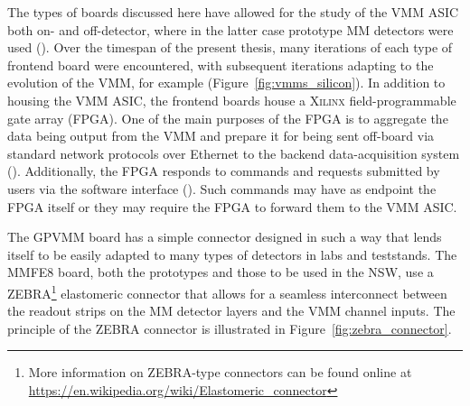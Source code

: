The types of boards discussed here have allowed for the study of the VMM ASIC both on- and off-detector,
where in the latter case prototype MM detectors were used ({\color{red}{More to say in Section XXX}}).
Over the timespan of the present thesis, many iterations of each type of frontend board
were encountered, with subsequent iterations adapting to the evolution of the VMM, for example (Figure~\ref{fig:vmms_silicon}).
In addition to housing the VMM ASIC, the frontend boards house a
\textsc{Xilinx} field-programmable gate array (FPGA). 
One of the main purposes of the FPGA is to aggregate the data being output from the VMM
and prepare it for being sent off-board via standard network protocols over Ethernet to the
backend data-acquisition system ({\color{red}{Section XXX}}).
Additionally, the FPGA responds to commands and requests submitted by users via the software
interface ({\color{red}{Section XXX}}).
Such commands may have as endpoint the FPGA itself or they may require the FPGA to forward
them to the VMM ASIC.

The GPVMM board has a simple connector designed in such a way that lends itself to
be easily adapted to many types of detectors in labs and teststands.
The MMFE8 board, both the prototypes and those to be used in the NSW, use a ZEBRA\footnote{More information
on ZEBRA-type connectors can be found online at \url{https://en.wikipedia.org/wiki/Elastomeric_connector}} elastomeric
connector that allows for a seamless interconnect between the readout strips on the MM detector layers
and the VMM channel inputs.
The principle of the ZEBRA connector is illustrated in Figure~\ref{fig:zebra_connector}.

